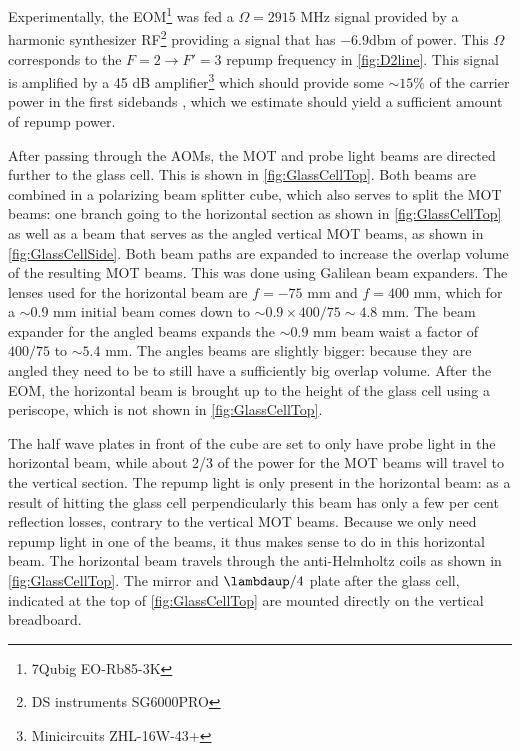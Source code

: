 Experimentally, the EOM\footnote{7Qubig EO-Rb85-3K} was fed a $\Omega = 2915$ MHz signal provided by a harmonic synthesizer RF\footnote{DS instruments SG6000PRO} providing a signal that has $-6.9$dbm of power.
This $\Omega$ corresponds to the $F=2 \rightarrow F'=3$ repump frequency in \cref{fig:D2line}.
This signal is amplified by a 45 dB amplifier\footnote{Minicircuits ZHL-16W-43+} which should provide some $\sim 15$\% of the carrier power in the first sidebands \cite{Rens2014}, which we estimate should yield a sufficient amount of repump power. 

After passing through the AOMs, the MOT and probe light beams are directed further to the glass cell. 
This is shown in \cref{fig:GlassCellTop}.
Both beams are combined in a polarizing beam splitter cube, which also serves to split the MOT beams: one branch going to the horizontal section as shown in \cref{fig:GlassCellTop} as well as a beam that serves as the angled vertical MOT beams, as shown in \cref{fig:GlassCellSide}. 
Both beam paths are expanded to increase the overlap volume of the resulting MOT beams.
This was done using Galilean beam expanders. 
The lenses used for the horizontal beam are $f=-75$ mm and $f=400$ mm, which for a $\sim 0.9$ mm initial beam comes down to $\sim 0.9 \times 400/75 \sim 4.8$ mm.
The beam expander for the angled beams expands the $\sim0.9$ mm beam waist a factor of $400/75$ to $\sim5.4$ mm.
The angles beams are slightly bigger: because they are angled they need to be to still have a sufficiently big overlap volume. 
After the EOM, the horizontal beam is brought up to the height of the glass cell using a periscope, which is not shown in \cref{fig:GlassCellTop}.

The half wave plates in front of the cube are set to only have probe light in the horizontal beam, while about 2/3 of the power for the MOT beams will travel to the vertical section. 
The repump light is only present in the horizontal beam: as a result of hitting the glass cell perpendicularly this beam has only a few per cent reflection losses, contrary to the vertical MOT beams. 
Because we only need repump light in one of the beams, it thus makes sense to do in this horizontal beam. 
The horizontal beam travels through the anti-Helmholtz coils as shown in \cref{fig:GlassCellTop}.
The mirror and $\lambdaup/4$ plate after the glass cell, indicated at the top of \cref{fig:GlassCellTop} are mounted directly on the vertical breadboard. 


